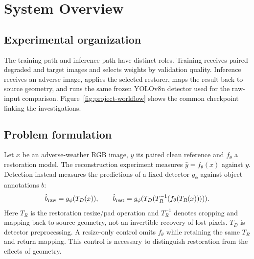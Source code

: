 \section{System Overview}
\label{sec:system}
\subsection{Experimental organization}
The training path and inference path have distinct roles.
Training receives paired degraded and target images and selects weights by
validation quality. Inference receives an adverse image, applies the selected
restorer, maps the result back to source geometry, and runs the same frozen
YOLOv8n detector used for the raw-input comparison. Figure~\ref{fig:project-workflow}
shows the common checkpoint linking the investigations.



\subsection{Problem formulation}
Let $x$ be an adverse-weather RGB image, $y$ its paired clean reference and
$f_\theta$ a restoration model. The reconstruction experiment measures
$\hat y=f_\theta(x)$ against $y$. Detection instead measures the predictions
of a fixed detector $g_\phi$ against object annotations $b$:
\begin{equation}
\hat b_{\rm raw}=g_\phi(T_D(x)),\qquad
\hat b_{\rm rest}=g_\phi(T_D(T_R^{-1}(f_\theta(T_R(x))))).
\end{equation}
Here $T_R$ is the restoration resize/pad operation and $T_R^{-1}$ denotes
cropping and mapping back to source geometry, not an invertible recovery of
lost pixels. $T_D$ is detector preprocessing. A resize-only control omits
$f_\theta$ while retaining the same $T_R$ and return mapping. This control is
necessary to distinguish restoration from the effects of geometry.

